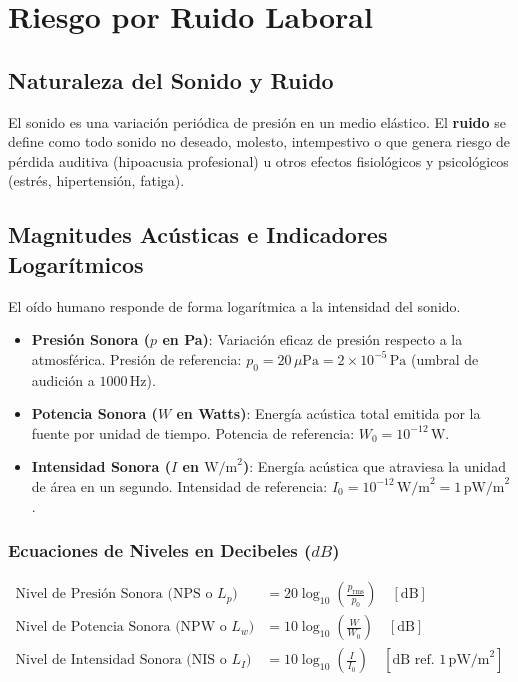 \documentclass[]{informeutn}
\begin{document}
\chapter{Riesgo por Ruido Laboral}

\section{Naturaleza del Sonido y Ruido}
El sonido es una variación periódica de presión en un medio elástico. El \textbf{ruido} se define como todo sonido no deseado, molesto, intempestivo o que genera riesgo de pérdida auditiva (hipoacusia profesional) u otros efectos fisiológicos y psicológicos (estrés, hipertensión, fatiga).

\section{Magnitudes Acústicas e Indicadores Logarítmicos}
El oído humano responde de forma logarítmica a la intensidad del sonido.

\begin{itemize}
    \item \textbf{Presión Sonora ($p$ en Pa)}: Variación eficaz de presión respecto a la atmosférica. Presión de referencia: $p_0 = 20\,\mu\text{Pa} = 2 \times 10^{-5}\,\text{Pa}$ (umbral de audición a $1000\,\text{Hz}$).
    \item \textbf{Potencia Sonora ($W$ en Watts)}: Energía acústica total emitida por la fuente por unidad de tiempo. Potencia de referencia: $W_0 = 10^{-12}\,\text{W}$.
    \item \textbf{Intensidad Sonora ($I$ en $\text{W/m}^2$)}: Energía acústica que atraviesa la unidad de área en un segundo. Intensidad de referencia: $I_0 = 10^{-12}\,\text{W/m}^2 = 1\,\text{pW/m}^2$.
\end{itemize}

\subsection{Ecuaciones de Niveles en Decibeles ($dB$)}
\begin{align}
\text{Nivel de Presión Sonora (NPS o } L_p\text{)} &= 20 \log_{10} \left( \frac{p_{\text{rms}}}{p_0} \right) \quad [\text{dB}] \\
\text{Nivel de Potencia Sonora (NPW o } L_w\text{)} &= 10 \log_{10} \left( \frac{W}{W_0} \right) \quad [\text{dB}] \\
\text{Nivel de Intensidad Sonora (NIS o } L_I\text{)} &= 10 \log_{10} \left( \frac{I}{I_0} \right) \quad [\text{dB ref. } 1\,\text{pW/m}^2]
\end{align}
\end{document}
